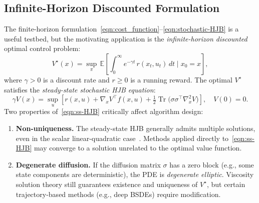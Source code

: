 \subsection{Infinite-Horizon Discounted Formulation}
The finite-horizon formulation~\eqref{eqn:cost_function}--\eqref{eqn:stochastic-HJB}
is a useful testbed, but the motivating application is the
\emph{infinite-horizon discounted} optimal control problem:
\begin{equation}\label{eqn:inf_horizon_cost}
  V^\star(x) = \sup_{\pi}\,\mathbb{E}\!\left[
    \int_0^\infty e^{-\gamma t}\,r(x_t,u_t)\,dt \;\Big|\; x_0=x
  \right],
\end{equation}
where $\gamma>0$ is a discount rate and $r\geq 0$ is a running reward.
The optimal $V^\star$ satisfies the \emph{steady-state stochastic HJB equation}:
\begin{equation}\label{eqn:ss-HJB}
  \gamma V(x) = \sup_u\!\left[
    r(x,u) + \nabla_x V^\top f(x,u)
    + \tfrac{1}{2}\operatorname{Tr}\!\bigl(\sigma\sigma^\top \nabla_x^2 V\bigr)
  \right], \quad V(0)=0.
\end{equation}
Two properties of~\eqref{eqn:ss-HJB} critically affect algorithm design:
\begin{enumerate}
  \item \textbf{Non-uniqueness.} The steady-state HJB generally admits multiple solutions, even in the scalar linear-quadratic case~\cite{fotiadis2025pinn}. Methods applied directly to~\eqref{eqn:ss-HJB} may converge to a solution unrelated to the optimal value function.
  \item \textbf{Degenerate diffusion.} If the diffusion matrix $\sigma$ has a zero block (e.g., some state components are deterministic), the PDE is \emph{degenerate elliptic}.
        Viscosity solution theory still guarantees existence and uniqueness of $V^\star$, but certain trajectory-based methods (e.g., deep BSDEs) require modification.
\end{enumerate}